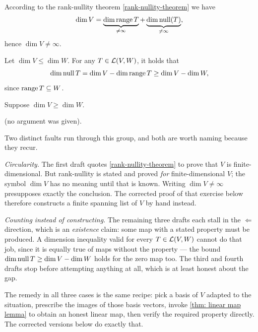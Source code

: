 \begin{failedattempt}
  According to the rank-nullity theorem \ref{rank-nullity-theorem} we have
  \begin{equation}
    \dim V = \underbrace{\dim \operatorname{range} T}_{\neq \infty} + \underbrace{\dim \operatorname{null} (T)}_{\neq \infty},
  \end{equation}
  hence $\dim V \neq \infty$.

  Let $\dim V \leq \dim W$. For any $T \in \mathcal{L}(V,W)$, it holds that
  \begin{equation}
    \dim \operatorname{null} T = \dim V - \dim \operatorname{range} T \geq \dim V - \dim W,
  \end{equation}
  since $\operatorname{range} T \subseteq W$.

  Suppose $\dim V \geq \dim W$.

  (no argument was given).
\end{failedattempt}

\begin{ainote}
  Two distinct faults run through this group, and both are worth naming because they recur.

  \emph{Circularity.} The first draft quotes \ref{rank-nullity-theorem} to prove that $V$ is finite-dimensional. But rank-nullity is stated and proved \emph{for} finite-dimensional $V$; the symbol $\dim V$ has no meaning until that is known. Writing $\dim V \neq \infty$ presupposes exactly the conclusion. The corrected proof of that exercise below therefore constructs a finite spanning list of $V$ by hand instead.

  \emph{Counting instead of constructing.} The remaining three drafts each stall in the $\Leftarrow$ direction, which is an \emph{existence} claim: some map with a stated property must be produced. A dimension inequality valid for every $T \in \mathcal{L}(V,W)$ cannot do that job, since it is equally true of maps without the property --- the bound $\dim \operatorname{null} T \geq \dim V - \dim W$ holds for the zero map too. The third and fourth drafts stop before attempting anything at all, which is at least honest about the gap.

  The remedy in all three cases is the same recipe: pick a basis of $V$ adapted to the situation, prescribe the images of those basis vectors, invoke \ref{thm: linear map lemma} to obtain an honest linear map, then verify the required property directly. The corrected versions below do exactly that.
\end{ainote}

